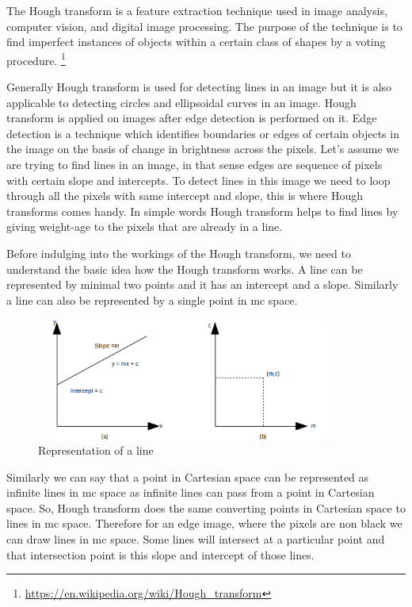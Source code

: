     The Hough transform is a feature extraction technique used in image analysis, computer vision, and digital image processing. The purpose of the technique is to find imperfect instances of objects within a certain class of shapes by a voting procedure. \footnote{\url{https://en.wikipedia.org/wiki/Hough_transform}}
    
    Generally Hough transform is used for detecting lines in an image but it is also applicable to detecting circles and ellipsoidal curves in an image. Hough transform is applied on images after edge detection is performed on it. Edge detection is a technique which identifies boundaries or edges of certain objects in the image on the basis of change in brightness across the pixels. Let's assume we are trying to find lines in an image, in that sense edges are sequence of pixels with certain slope and intercepts. To detect lines in this image we need to loop through all the pixels with same intercept and slope, this is where Hough transforms comes handy. In simple words Hough transform helps to find lines by giving weight-age to the pixels that are already in a line. 
    
    Before indulging into the workings of the Hough transform, we need to understand the basic idea how the Hough transform works. A line can be represented by minimal two points and it has an intercept and a slope. Similarly a line can also be represented by a single point in mc space.
    
                \begin{figure}[h]
    \centering
    \includegraphics[width=10cm, height =4cm]{images/hough1.png}
    \caption{Representation of a line}
    \end{figure}
    
    Similarly we can say that a point in Cartesian space can be represented as infinite lines in mc space as infinite lines can pass from a point in Cartesian space. So, Hough transform does the same converting points in Cartesian space to lines in mc space. Therefore for an edge image, where the pixels are non black we can draw lines in mc space. Some lines will intersect at a particular point and that intersection point is this slope and intercept of those lines. 
    
